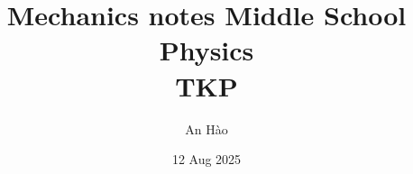 \usepackage[utf8]{inputenc}
\usepackage[T1]{fontenc}

\usepackage{blindtext} %
\usepackage{color,soul} %
\usepackage[dvipsnames]{xcolor} %
\usepackage{tcolorbox}

\usepackage{amsmath, booktabs}
\usepackage{amsthm}
\usepackage{amssymb}
\usepackage{amsfonts}
\usepackage{mathtools}

\usepackage{graphicx}
\usepackage{subcaption}
\graphicspath{ {./figures/} }


\usepackage{tikz}



\usepackage[
  left=20mm,
  right=20mm,
  top=25mm,
  bottom=25mm,
  headsep=10mm,
  footskip=15mm,
]{geometry}

\usepackage{fancyhdr}
\usepackage{lastpage}

\pagestyle{fancy}
\fancyhf{} %
\renewcommand{\headrulewidth}{0pt} %

\lhead{\leftmark}
\rhead{\thepage}

\renewcommand{\baselinestretch}{1.2}

\setlength{\parskip}{1.3mm}

\usepackage[vietnamese=nohyphenation]{hyphsubst} %
\usepackage[vietnamese]{babel}

\usepackage{hyperref} %
    

\usepackage[Glenn]{fncychap}

\usepackage{subfiles} %

\title{Mechanics notes}
\title{
	{Middle School Physics}\\
	{\large TKP}\\
}
\author{An Hào}
\date{12 Aug 2025}
